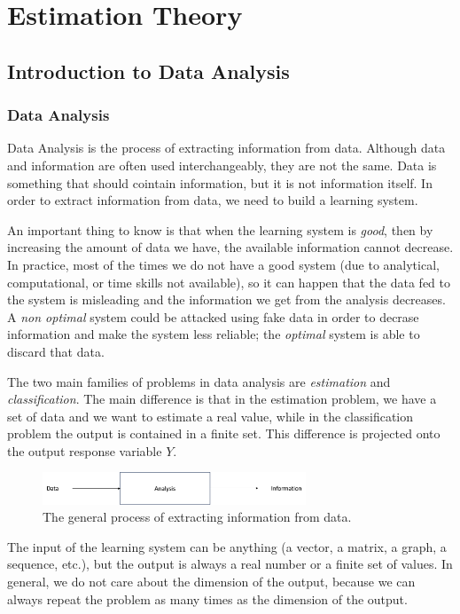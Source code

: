 \chapter{Estimation Theory}
\section{Introduction to Data Analysis}
\subsection{Data Analysis}
Data Analysis is the process of extracting information from data. Although data and information are often used interchangeably, they are not the same. Data is something that should cointain information, but it is not information itself. In order to extract information from data, we need to build a learning system.

An important thing to know is that when the learning system is \textit{good}, then by increasing the amount of data we have, the available information cannot decrease. In practice, most of the times we do not have a good system (due to analytical, computational, or time skills not available), so it can happen that the data fed to the system is misleading and the information we get from the analysis decreases. A \textit{non optimal} system could be attacked using fake data in order to decrase information and make the system less reliable; the \textit{optimal} system is able to discard that data.

The two main families of problems in data analysis are \textit{estimation} and \textit{classification}. The main difference is that in the estimation problem,
we have a set of data and we want to estimate a real value, while in the classification problem the output is contained in a finite set. This difference is projected onto the output response variable $Y$.

\begin{figure}
    \centering
    \includegraphics[width=0.7\textwidth]{./figures/chapter_2/data2information.png}
    \caption{The general process of extracting information from data.}
    \label{fig:data2information}
\end{figure}

The input of the learning system can be anything (a vector, a matrix, a graph, a sequence, etc.), but the output is always a real number or a finite set of values. In general,
we do not care about the dimension of the output, because we can always repeat the problem as many times as the dimension of the output.

